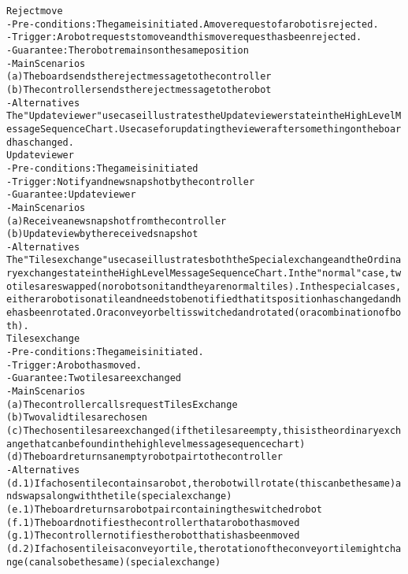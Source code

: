 \begin{alltt}
Reject move
- Pre-conditions: The game is initiated. A move request of a robot is rejected.
- Trigger: A robot requests to move and this move request has been rejected.
- Guarantee: The robot remains on the same position
- Main Scenarios
    (a) The board sends the reject message to the controller
    (b) The controller sends the reject message to the robot
- Alternatives \\

The "Update viewer" use case illustrates the Update viewer state in the High Level Message Sequence Chart. Use case for updating the viewer after something on the board has changed. \\

Update viewer
- Pre-conditions: The game is initiated
- Trigger: Notify and new snapshot by the controller
- Guarantee: Update viewer
- Main Scenarios
    (a) Receive a new snapshot from the controller
    (b) Update view by the received snapshot
- Alternatives \\

The "Tiles exchange" use case illustrates both the Special exchange and the Ordinary exchange state in the High Level Message Sequence Chart. In the "normal" case, two tiles are swapped (no robots on it and they are normal tiles). In the special cases, either a robot is on a tile and needs to be notified that its position has changed and he has been rotated. Or a conveyor belt is switched and rotated (or a combination of both). \\

Tiles exchange
- Pre-conditions: The game is initiated.
- Trigger:  A robot has moved.
- Guarantee: Two tiles are exchanged
- Main Scenarios
    (a) The controller calls requestTilesExchange
    (b) Two valid tiles are chosen
    (c) The chosen tiles are exchanged (if the tiles are empty, this is the ordinary exchange that can be found in the high level message sequence chart)
    (d) The board returns an empty robot pair to the controller
- Alternatives
    (d.1) If a chosen tile contains a robot, the robot will rotate (this can be the same) and swaps along with the tile (special exchange)
    (e.1) The board returns a robot pair containing the switched robot
    (f.1) The board notifies the controller that a robot has moved
    (g.1) The controller notifies the robot that is has been moved \\

    (d.2) If a chosen tile is a conveyor tile, the rotation of the conveyor tile might change (can also be the same) (special exchange) \\



\end{alltt}

